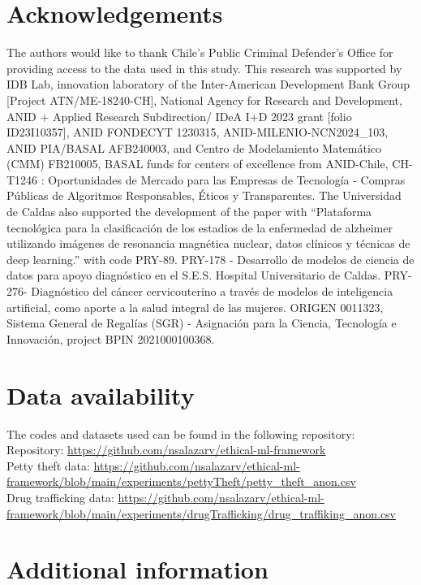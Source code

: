 \documentclass[fleqn,10pt]{wlscirep}
\begin{document}
\section*{Acknowledgements}

The authors would like to thank Chile's Public Criminal Defender’s Office for providing access to the data used in this study. This research was supported by IDB Lab, innovation laboratory of the Inter-American Development Bank Group [Project ATN/ME-18240-CH], National Agency for Research and Development, ANID + Applied Research Subdirection/ IDeA I+D 2023 grant [folio ID23I10357], ANID FONDECYT 1230315, ANID-MILENIO-NCN2024\_103, ANID PIA/BASAL AFB240003, and Centro de Modelamiento Matemático (CMM) FB210005, BASAL funds for centers of excellence from ANID-Chile, CH-T1246 : Oportunidades de Mercado para las Empresas de Tecnología - Compras Públicas de Algoritmos Responsables, Éticos y Transparentes. The Universidad de Caldas also supported the development of the paper with “Plataforma tecnológica para la clasificación de los estadios de la enfermedad de alzheimer utilizando imágenes de resonancia magnética nuclear, datos clínicos y técnicas de deep learning.” with code PRY-89. PRY-178 - Desarrollo de modelos de ciencia de datos para apoyo diagnóstico en el S.E.S. Hospital Universitario de Caldas. PRY-276- Diagnóstico del cáncer cervicouterino a través de modelos de inteligencia artificial, como aporte a la salud integral de las mujeres. ORIGEN 0011323, Sistema General de Regalías (SGR) - Asignación para la Ciencia, Tecnología e Innovación, project BPIN 2021000100368.

\section*{Data availability}
The codes and datasets used can be found in the following repository: \\
Repository: \url{https://github.com/nsalazarv/ethical-ml-framework}
\\Petty theft data: \url{https://github.com/nsalazarv/ethical-ml-framework/blob/main/experiments/pettyTheft/petty_theft_anon.csv}
\\ Drug trafficking data: \url{https://github.com/nsalazarv/ethical-ml-framework/blob/main/experiments/drugTrafficking/drug_traffiking_anon.csv}

\clearpage

\section*{Additional information}
\end{document}
